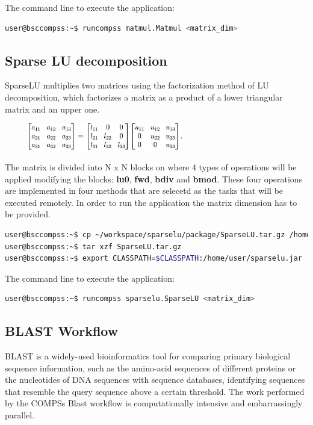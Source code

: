The command line to execute the application:

\begin{lstlisting}[language=bash]
user@bsccompss:~$ runcompss matmul.Matmul <matrix_dim>
\end{lstlisting}


\subsection{Sparse LU decomposition}
SparseLU multiplies two matrices using the factorization method of LU decomposition, which factorizes a matrix as a product of a lower triangular matrix and an upper one.

\begin{figure}[ht!]
  \centering
    \includegraphics[width=0.6\textwidth]{./Sections/4_Sample_Apps/Figures/SparseLU.jpeg}
\end{figure}

The matrix is divided into N x N blocks on where 4 types of operations will be applied modifying the blocks: {\bf lu0}, {\bf fwd}, {\bf bdiv} and {\bf bmod}. These four operations are implemented in four methods that are selecetd as the tasks that will be executed remotely. In order to run the application the matrix dimension has to be provided.

\begin{lstlisting}[language=bash]
user@bsccompss:~$ cp ~/workspace/sparselu/package/SparseLU.tar.gz /home/user/
user@bsccompss:~$ tar xzf SparseLU.tar.gz
user@bsccompss:~$ export CLASSPATH=$CLASSPATH:/home/user/sparselu.jar
\end{lstlisting}

The command line to execute the application:

\begin{lstlisting}[language=bash]
user@bsccompss:~$ runcompss sparselu.SparseLU <matrix_dim>
\end{lstlisting}

\subsection{BLAST Workflow}
BLAST is a widely-used bioinformatics tool for comparing primary biological sequence information, such as the amino-acid sequences of different proteins or the nucleotides of DNA sequences with sequence databases, identifying sequences that resemble the query sequence above a certain threshold. The work performed by the COMPSs Blast workflow is computationally intensive and embarrassingly parallel.

